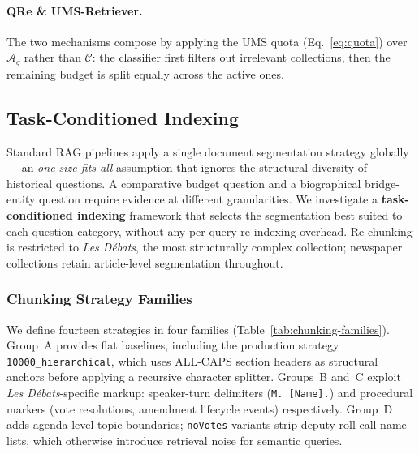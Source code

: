 \paragraph{QRe \& UMS-Retriever.}
The two mechanisms compose by applying the UMS quota
(Eq.~\ref{eq:quota}) over $\mathcal{A}_q$ rather than $\mathcal{C}$:
the classifier first filters out irrelevant collections, then the remaining
budget is split equally across the active ones.




\subsection{Task-Conditioned Indexing}
\label{sec:indexing-methodology}

Standard RAG pipelines apply a single document segmentation strategy globally —
an \emph{one-size-fits-all} assumption that ignores the structural diversity of
historical questions.
A comparative budget question and a biographical bridge-entity question require
evidence at different granularities.
We investigate a \textbf{task-conditioned indexing} framework that selects the
segmentation best suited to each question category, without any per-query
re-indexing overhead.
Re-chunking is restricted to \textit{Les Débats}, the most structurally complex
collection; newspaper collections retain article-level segmentation throughout.

\subsubsection{Chunking Strategy Families}
\label{sec:chunking-families}

We define fourteen strategies in four families (Table~\ref{tab:chunking-families}).
Group~A provides flat baselines, including the production strategy
\texttt{10000\_hierarchical}, which uses ALL-CAPS section headers as structural
anchors before applying a recursive character splitter.
Groups~B and~C exploit \textit{Les Débats}-specific markup: speaker-turn
delimiters (\texttt{M.~[Name].}) and procedural markers (vote resolutions,
amendment lifecycle events) respectively.
Group~D adds agenda-level topic boundaries; \texttt{noVotes} variants strip
deputy roll-call name-lists, which otherwise introduce retrieval noise for
semantic queries.


